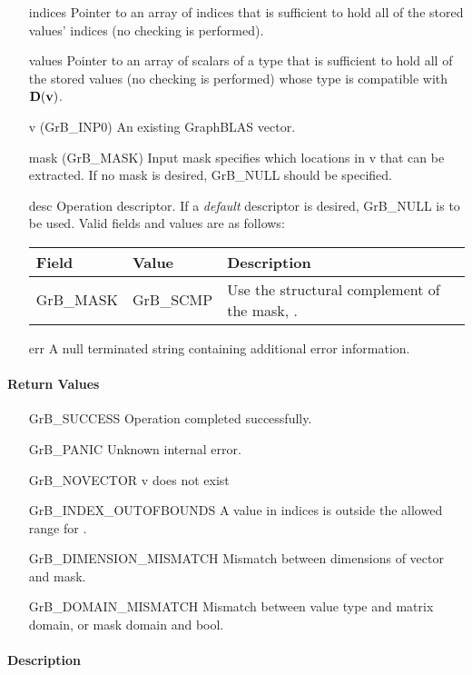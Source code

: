 \begin{itemize}[leftmargin=1.1in]
    \item[{\sf indices}] Pointer to an array of indices that is sufficient to
                        hold all of the stored values' indices (no checking is performed).
    \item[{\sf values}] Pointer to an array of scalars of a type that is sufficient to
                        hold all of the stored values (no checking is performed) whose
                        type is compatible with $\bold{D}({\bf v})$.
    \item[{\sf v}]      ({\sf GrB\_INP0}) An existing GraphBLAS vector.
    \item[{\sf mask}]   ({\sf GrB\_MASK}) Input mask specifies which locations in
                        {\sf v} that can be extracted.  If no mask is desired,
                        {\sf GrB\_NULL} should be specified.
    \item[{\sf desc}]   Operation descriptor. If a
    \emph{default} descriptor is desired, {\sf GrB\_NULL} is to be
    used.  Valid fields and values are as follows: \\
    \begin{tabular}{llp{3in}}
    Field  & Value & Description \\
    \hline
    {\sf GrB\_MASK} & {\sf GrB\_SCMP}   & Use the structural complement of the mask, . \\
    \end{tabular}
    \item[{\sf err}]     A null terminated string containing additional error information.
\end{itemize}

\paragraph{Return Values}

\begin{itemize}[leftmargin=2.1in]
    \item[{\sf GrB\_SUCCESS}]     Operation completed successfully.
    \item[{\sf GrB\_PANIC}]            Unknown internal error.
    \item[{\sf GrB\_NOVECTOR}]      {\sf v} does not exist
    \item[{\sf GrB\_INDEX\_OUTOFBOUNDS}]
                       A value in {\sf indices} is outside the allowed range for .
    \item[\sf GrB\_DIMENSION\_MISMATCH]  
                       Mismatch between dimensions of vector and mask. 
    \item[\sf GrB\_DOMAIN\_MISMATCH]  
                       Mismatch between value type and matrix domain, or mask domain and {\sf bool}.
\end{itemize}


\paragraph{Description}
